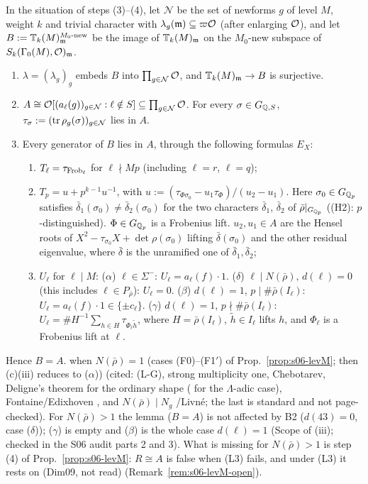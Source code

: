 \begin{lemma}\label{lem:s06-levM-hecke}
In the situation of steps (3)--(4), let $\mathcal N$ be the set of newforms $g$ of level $M$, weight $k$ and trivial character with
$\lambda_g(\mathfrak{m})\subseteq\varpi\mathcal{O}$ (after enlarging $\mathcal{O}$), and let $B:=\mathbb{T}_k(M)^{M_0\text{-new}}_{\mathfrak{m}}$ be the image of $\mathbb{T}_k(M)_{\mathfrak{m}}$ on the
$M_0$-new subspace of $S_k(\Gamma_0(M),\mathcal{O})_{\mathfrak{m}}$.
\begin{enumerate}[label=(\alph*)]
\item $\lambda=(\lambda_g)_g$ embeds $B$ into $\prod_{g\in\mathcal N}\mathcal{O}$, and $\mathbb{T}_k(M)_{\mathfrak{m}}\to B$ is surjective.
\item $A\cong\mathcal{O}[(a_\ell(g))_{g\in\mathcal N}:\ell\notin S]\subseteq\prod_{g\in\mathcal N}\mathcal{O}$. For every $\sigma\in G_{\mathbb{Q},S}$,
  $\tau_\sigma:=(\operatorname{tr}\rho_g(\sigma))_{g\in\mathcal N}$ lies in $A$.
\item Every generator of $B$ lies in $A$, through the following formulas $E_X$:
  \begin{enumerate}[label=(\roman*)]
  \item $T_\ell=\tau_{\mathrm{Frob}_\ell}$ for $\ell\nmid Mp$ (including $\ell=r$, $\ell=q$);
  \item $T_p=u+p^{k-1}u^{-1}$, with $u:=(\tau_{\Phi\sigma_0}-u_1\tau_\Phi)/(u_2-u_1)$. Here $\sigma_0\in G_{\mathbb{Q}_p}$ satisfies
    $\bar\delta_1(\sigma_0)\ne\bar\delta_2(\sigma_0)$ for the two characters $\bar\delta_1$, $\bar\delta_2$ of $\bar\rho|_{G_{\mathbb{Q}_p}}$ ((H2):
    $p$-distinguished). $\Phi\in G_{\mathbb{Q}_p}$ is a Frobenius lift. $u_2,u_1\in A$ are the Hensel roots of
    $X^2-\tau_{\sigma_0}X+\det\rho(\sigma_0)$ lifting $\bar\delta(\sigma_0)$ and the other residual eigenvalue, where $\bar\delta$ is the
    unramified one of $\bar\delta_1,\bar\delta_2$;
  \item $U_\ell$ for $\ell\mid M$: ($\alpha$) $\ell\in\Sigma^-$: $U_\ell=a_\ell(f)\cdot1$. ($\delta$) $\ell\mid N(\bar\rho)$, $d(\ell)=0$ (this includes
    $\ell\in P_{\bar\rho}$): $U_\ell=0$. ($\beta$) $d(\ell)=1$, $p\mid\#\bar\rho(I_\ell)$: $U_\ell=a_\ell(f)\cdot1\in\{\pm c_\ell\}$. ($\gamma$) $d(\ell)=1$,
    $p\nmid\#\bar\rho(I_\ell)$: $U_\ell=\#H^{-1}\sum_{h\in H}\tau_{\Phi_\ell\tilde h}$, where $H=\bar\rho(I_\ell)$, $\tilde h\in I_\ell$ lifts $h$, and $\Phi_\ell$ is a
    Frobenius lift at $\ell$.
  \end{enumerate}
\end{enumerate}
Hence $B=A$. \stpmc{} when $N(\bar\rho)=1$ (cases (F0)--(F1$'$) of Prop.~\ref{prop:s06-levM}; then (c)(iii) reduces to ($\alpha$)) (cited:
(L-G), strong multiplicity one, Chebotarev, Deligne's theorem \cite[Thm~2.5]{Edi92} for the ordinary shape (\cite{W88} for the $\Lambda$-adic
case), Fontaine/Edixhoven \cite[Thm~2.6]{Edi92}, and $N(\bar\rho)\mid N_g$ \cite{Car86}/Livn\'e; the last is standard and not page-checked).
For $N(\bar\rho)>1$ the lemma ($B=A$) is not affected by B2 ($d(43)=0$, case ($\delta$)); ($\gamma$) is empty and ($\beta$) is the whole case $d(\ell)=1$ (Scope of (iii); checked in the S06 audit parts 2 and 3). What is missing for $N(\bar\rho)>1$ is step (4) of Prop.~\ref{prop:s06-levM}:
$R\cong A$ is false when (L3) fails, and under (L3) it rests on \cite[Lemma~2.4]{KO} (Dim09, not read) (Remark~\ref{rem:s06-levM-open}).


\end{lemma}
